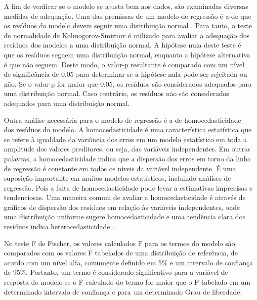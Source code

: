 A fim de verificar se o modelo se ajusta bem aos dados, são examinadas diversas medidas de adequação. Uma das premissas de um modelo de regressão é a de que os resíduos do modelo devem seguir uma distribuição normal \cite{montgomery}. Para tanto, o teste de normalidade de Kolmogorov-Smirnov é utilizado para avaliar a adequação dos resíduos dos modelos a uma distribuição normal. A hipótese nula deste teste é que os resíduos seguem uma distribuição normal, enquanto a hipótese alternativa é que não seguem. Deste modo, o valor-p resultante é comparado com um nível de significância de 0,05 para determinar se a hipótese nula pode ser rejeitada ou não. Se o valor-p for maior que 0,05, os resíduos são considerados adequados para uma distribuição normal. Caso contrário, os resíduos não são considerados adequados para uma distribuição normal.

Outra análise necessária para o modelo de regressão é a de homocedasticidade dos resíduos do modelo. A homocedasticidade é uma característica estatística que se refere à igualdade da variância dos erros em um modelo estatístico em toda a amplitude dos valores preditores, ou seja, das variáveis independentes. Em outras palavras, a homocedasticidade indica que a dispersão dos erros em torno da linha de regressão é constante em todos os níveis da variável independente. É uma suposição importante em muitos modelos estatísticos, incluindo análises de regressão. Pois a falta de homocedasticidade pode levar a estimativas imprecisas e tendenciosas. Uma maneira comum de avaliar a homocedasticidade é através de gráficos de dispersão dos resíduos em relação às variáveis independentes, onde uma distribuição uniforme sugere homocedasticidade e uma tendência clara dos resíduos indica heterocedasticidade \cite{myers}.

No teste F de Fischer, os valores calculados F para os termos do modelo são comparados com os valores F tabelados de uma distribuição de referência, de acordo com um nível alfa, comumente definido em 5\% e um intervalo de confiança de 95\%. Portanto, um termo é considerado significativo para a variável de resposta do modelo se o F calculado do termo for maior que o F tabelado em um determinado intervalo de confiança e para um determinado Grau de liberdade.



